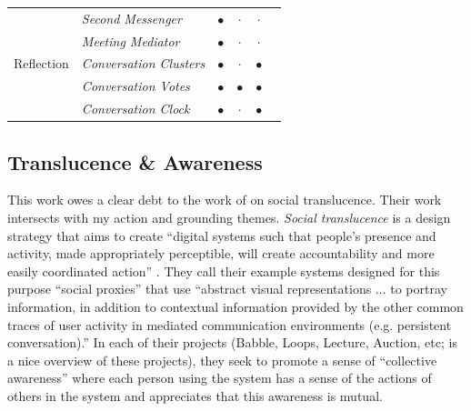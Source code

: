 \documentclass{tufte-handout}
\begin{document}
\begin{tabular}{clcccl}
\midrule


\multirow{5}{*}{\begin{sideways}Reflection\end{sideways}} & \emph{Second Messenger} &$\bullet$& $\cdot$ & $\cdot$ & \citep{DiMicco:2007ie} \\
& \emph{Meeting Mediator} &$\bullet$& $\cdot$ & $\cdot$ & \citep{Kim:2008ip} \\
& \emph{Conversation Clusters} &$\bullet$& $\cdot$ &$\bullet$& \citep{Bergstrom:2009fe} \\
& \emph{Conversation Votes} &$\bullet$&$\bullet$&$\bullet$& \citep{Bergstrom:2009ej} \\
& \emph{Conversation Clock} &$\bullet$& $\cdot$ &$\bullet$& \citep{Bergstrom:2007je} \\
\bottomrule
\end{tabular}

\subsection{Translucence \& Awareness}

This work owes a clear debt to the work of \citet{Erickson:2000kb} on social translucence. Their work intersects with my action and grounding themes. \emph{Social translucence} is a design strategy that aims to create ``digital systems such that people's presence and activity, made appropriately perceptible, will create accountability and more easily coordinated action''  \citep{Kellogg:2002ts}. They call their example systems designed for this purpose ``social proxies'' that use ``abstract visual representations ... to portray information, in addition to contextual information provided by the other common traces of user activity in mediated communication environments (e.g. persistent conversation).'' In each of their projects (Babble, Loops, Lecture, Auction, etc; \citep{Erickson:2003td} is a nice overview of these projects), they seek to promote a sense of ``collective awareness'' where each person using the system has a sense of the actions of others in the system and appreciates that this awareness is mutual. 
\end{document}
